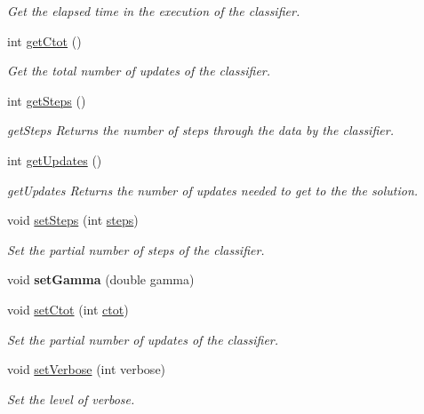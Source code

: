 \begin{DoxyCompactItemize}
\begin{DoxyCompactList}\small\item\em Get the elapsed time in the execution of the classifier. \end{DoxyCompactList}\item 
int \hyperlink{class_classifier_ab80a78cd6a4efc59b16f5b80cd64dc63}{get\+Ctot} ()
\begin{DoxyCompactList}\small\item\em Get the total number of updates of the classifier. \end{DoxyCompactList}\item 
int \hyperlink{class_classifier_a1fb3e4dfd80c154e89603c8fa1b11b76}{get\+Steps} ()
\begin{DoxyCompactList}\small\item\em get\+Steps Returns the number of steps through the data by the classifier. \end{DoxyCompactList}\item 
int \hyperlink{class_classifier_a738c2fbed982db6cad02062edcc037e4}{get\+Updates} ()
\begin{DoxyCompactList}\small\item\em get\+Updates Returns the number of updates needed to get to the the solution. \end{DoxyCompactList}\item 
void \hyperlink{class_classifier_a779b6cac0351e272ee0573d919d5d060}{set\+Steps} (int \hyperlink{class_classifier_a1e4c9c9ba059d5aff1d4d81eb41725cb}{steps})
\begin{DoxyCompactList}\small\item\em Set the partial number of steps of the classifier. \end{DoxyCompactList}\item 
\mbox{\label{class_classifier_aa802b07331c79ff9621b6a802adbbc91}} 
void {\bfseries set\+Gamma} (double gamma)
\item 
void \hyperlink{class_classifier_a3293d7d39c3934503a23b920f84f73e7}{set\+Ctot} (int \hyperlink{class_classifier_a99d9a7f504212bb3dc2726c10a2333c6}{ctot})
\begin{DoxyCompactList}\small\item\em Set the partial number of updates of the classifier. \end{DoxyCompactList}\item 
void \hyperlink{class_classifier_a073b94029512378ccfae3aa34aae0212}{set\+Verbose} (int verbose)
\begin{DoxyCompactList}\small\item\em Set the level of verbose. \end{DoxyCompactList}\item 

\end{DoxyCompactItemize}
